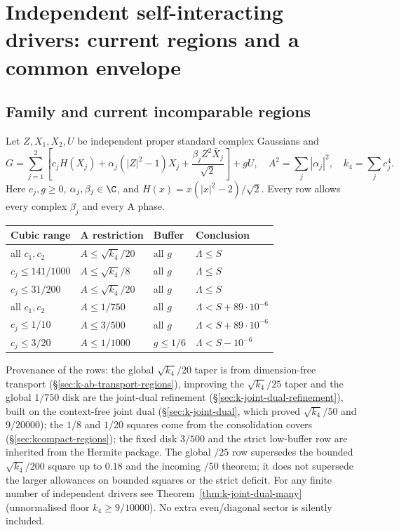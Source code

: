\section{Independent self-interacting drivers: current regions and a common envelope}
\label{ch:two-driver-cold}

\subsection{Family and current incomparable regions}
Let $Z,X_1,X_2,U$ be independent proper standard complex Gaussians and
\[
 G=\sum_{j=1}^2\left[c_jH(X_j)+\alpha_j(|Z|^2-1)X_j+
            \frac{\beta_jZ^2\bar X_j}{\sqrt2}\right]+gU,
 \quad A^2=\sum_j|\alpha_j|^2,\quad k_4=\sum_jc_j^4.
\]
Here $c_j,g\ge0$, $\alpha_j,\beta_j\in\C$, and
$H(x)=x(|x|^2-2)/\sqrt2$. Every row allows every complex $\beta_j$
and every A phase.
\begin{center}
\begin{tabular}{llll}
\toprule
Cubic range & A restriction & Buffer & Conclusion\\
\midrule
all $c_1,c_2$ & $A\le\sqrt{k_4}/20$ & all $g$ & $\Lambda\le S$\\
$c_j\le141/1000$ & $A\le\sqrt{k_4}/8$ & all $g$ & $\Lambda\le S$\\
$c_j\le31/200$ & $A\le\sqrt{k_4}/20$ & all $g$ & $\Lambda\le S$\\
all $c_1,c_2$ & $A\le1/750$ & all $g$ & $\Lambda<S+89\cdot10^{-6}$\\
$c_j\le1/10$ & $A\le3/500$ & all $g$ & $\Lambda<S+89\cdot10^{-6}$\\
$c_j\le3/20$ & $A\le1/1000$ & $g\le1/6$ & $\Lambda<S-10^{-6}$\\
\bottomrule
\end{tabular}
\end{center}
Provenance of the rows: the global $\sqrt{k_4}/20$ taper is from dimension-free transport (\S\ref{sec:k-ab-transport-regions}), improving the $\sqrt{k_4}/25$ taper and the global $1/750$ disk are the joint-dual refinement (\S\ref{sec:k-joint-dual-refinement}),
built on the context-free joint dual (\S\ref{sec:k-joint-dual}, which proved $\sqrt{k_4}/50$ and $9/20000$); the $1/8$ and $1/20$ squares come from the consolidation
covers (\S\ref{sec:kcompact-regions}); the fixed disk $3/500$ and the strict low-buffer row are inherited from the Hermite package. The global $/25$ row supersedes
the bounded $\sqrt{k_4}/200$ square up to $0.18$ and the incoming $/50$ theorem; it does not supersede the larger allowances on bounded squares or the strict deficit.
For any finite number of independent drivers see Theorem~\ref{thm:k-joint-dual-many} (unnormalised floor $k_4\ge9/10000$).
No extra even/diagonal sector is silently included.

